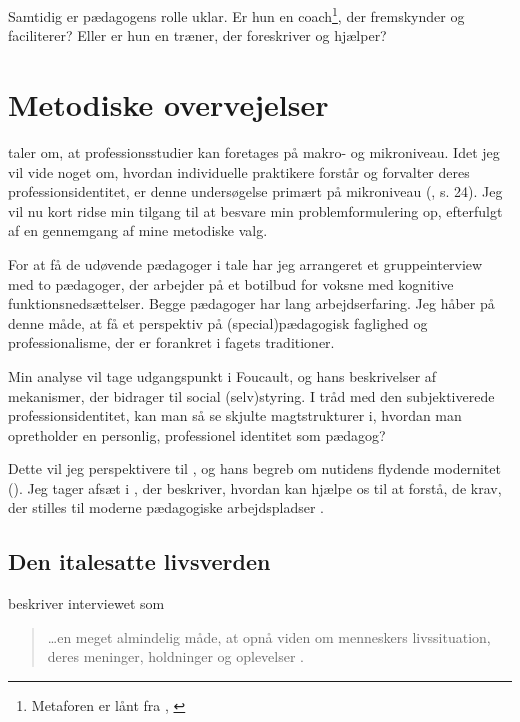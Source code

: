 Samtidig er pædagogens rolle uklar.
Er hun en coach\footnote{Metaforen er lånt fra \citeauthor{hurFrigorelsensMagt2015}, \citeyear{hurFrigorelsensMagt2015}}, der fremskynder og faciliterer?
Eller er hun en træner, der foreskriver og hjælper?

\section{Metodiske overvejelser}

\citeauthor{molanderProfesjonsstudierIntroduksjon2008} taler om, at  professionsstudier kan foretages på makro- og mikroniveau.
Idet jeg vil vide noget om, hvordan individuelle praktikere forstår og forvalter deres professionsidentitet, er denne undersøgelse primært på mikroniveau (\citeyear{molanderProfesjonsstudierIntroduksjon2008}, s. 24).
Jeg vil nu kort ridse min tilgang til at besvare min problemformulering op, efterfulgt af en gennemgang af mine metodiske valg.

For at få de udøvende pædagoger i tale har jeg arrangeret et gruppeinterview med to pædagoger, der arbejder på et botilbud for voksne med kognitive funktionsnedsættelser.
Begge pædagoger har lang arbejdserfaring.
Jeg håber på denne måde, at få et perspektiv på (special)pædagogisk faglighed og professionalisme, der er forankret i fagets traditioner.

Min analyse vil tage udgangspunkt i Foucault, og hans beskrivelser af mekanismer, der bidrager til social (selv)styring.
I tråd med den subjektiverede professionsidentitet, kan man så se skjulte magtstrukturer i, hvordan man opretholder en personlig, professionel identitet som pædagog?

Dette vil jeg perspektivere til \citeauthor{baumanLiquidModernity2000}, og hans begreb om nutidens flydende modernitet (\citeyear{baumanLiquidModernity2000}).
Jeg tager afsæt i \citeauthor{kofodOrganisationOgLedelse2016}, der beskriver, hvordan \citeauthor{baumanLiquidModernity2000} kan hjælpe os til at forstå, de krav, der stilles til moderne pædagogiske arbejdspladser \autocite{kofodOrganisationOgLedelse2016}.


\subsection{Den italesatte livsverden}
\citeauthor{tanggaardInterviewetSamtalenSom2015} beskriver interviewet som

\begin{quote}
\ldots en meget almindelig måde, at opnå viden om menneskers livssituation, deres meninger, holdninger og oplevelser \autocite[s. 29]{tanggaardInterviewetSamtalenSom2015}.
\end{quote}

